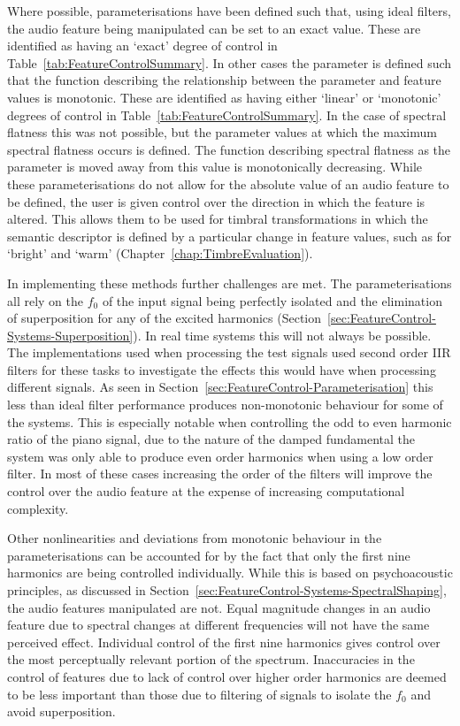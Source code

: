 	Where possible, parameterisations have been defined such that, using ideal filters, the audio feature being
	manipulated can be set to an exact value. These are identified as having an `exact' degree of control in
	Table~\ref{tab:FeatureControlSummary}. In other cases the parameter is defined such that the function describing
	the relationship between the parameter and feature values is monotonic. These are identified as having either
	`linear' or `monotonic' degrees of control in Table~\ref{tab:FeatureControlSummary}. In the case of spectral
	flatness this was not possible, but the parameter values at which the maximum spectral flatness occurs is defined.
	The function describing spectral flatness as the parameter is moved away from this value is monotonically
	decreasing. While these parameterisations do not allow for the absolute value of an audio feature to be defined,
	the user is given control over the direction in which the feature is altered. This allows them to be used for
	timbral transformations in which the semantic descriptor is defined by a particular change in feature values, such
	as for `bright' and `warm' (Chapter~\ref{chap:TimbreEvaluation}).

	In implementing these methods further challenges are met. The parameterisations all rely on the $f_{0}$ of the
	input signal being perfectly isolated and the elimination of superposition for any of the excited harmonics
	(Section~\ref{sec:FeatureControl-Systems-Superposition}). In real time systems this will not always be possible.
	The implementations used when processing the test signals used second order IIR filters for these tasks to
	investigate the effects this would have when processing different signals. As seen in
	Section~\ref{sec:FeatureControl-Parameterisation} this less than ideal filter performance produces non-monotonic
	behaviour for some of the systems. This is especially notable when controlling the odd to even harmonic ratio of
	the piano signal, due to the nature of the damped fundamental the system was only able to produce even order
	harmonics when using a low order filter. In most of these cases increasing the order of the filters will improve
	the control over the audio feature at the expense of increasing computational complexity.

	Other nonlinearities and deviations from monotonic behaviour in the parameterisations can be accounted for by the
	fact that only the first nine harmonics are being controlled individually. While this is based on psychoacoustic
	principles, as discussed in Section~\ref{sec:FeatureControl-Systems-SpectralShaping}, the audio features
	manipulated are not. Equal magnitude changes in an audio feature due to spectral changes at different frequencies
	will not have the same perceived effect. Individual control of the first nine harmonics gives control over the most
	perceptually relevant portion of the spectrum. Inaccuracies in the control of features due to lack of control over
	higher order harmonics are deemed to be less important than those due to filtering of signals to isolate the
	$f_{0}$ and avoid superposition.

